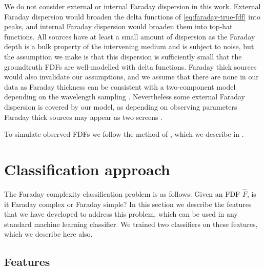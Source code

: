     We do not consider external or internal Faraday dispersion in this work. External Faraday dispersion would broaden the delta functions of \autoref{eq:faraday-true-fdf} into peaks, and internal Faraday dispersion would broaden them into top-hat functions. All sources have at least a small amount of dispersion as the Faraday depth is a bulk property of the intervening medium and is subject to noise, but the assumption we make is that this dispersion is sufficiently small that the groundtruth FDFs are well-modelled with delta functions. Faraday thick sources would also invalidate our assumptions, and we assume that there are none in our data as Faraday thickness can be consistent with a two-component model depending on the wavelength sampling \citep[e.g.][]{ma_broad-band_2019,brentjens_faraday_2005}. Nevertheless some external Faraday dispersion is covered by our model, as depending on observing parameters Faraday thick sources may appear as two screens \citep{van_eck_faraday_2017}.

    To simulate observed FDFs we follow the method of \citet{brown_classifying_2018}, which we describe in .

\section{Classification approach}
\label{sec:faraday-approach}

  The Faraday complexity classification problem is as follows: Given an FDF $\hat F$, is it Faraday complex or Faraday simple? In this section we describe the features that we have developed to address this problem, which can be used in any standard machine learning classifier. We trained two classifiers on these features, which we describe here also.

  \subsection{Features}
  \label{sec:faraday-scores-method}

